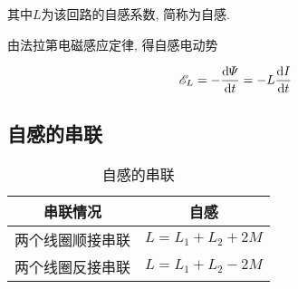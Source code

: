 其中$L$为该回路的自感系数, 简称为自感. 

由法拉第电磁感应定律, 得自感电动势

\begin{equation}
	\mathscr{E}_L = -\dv{\varPsi}{t} = -L \dv{I}{t} \label{C9-eq17}
\end{equation}

\subsection{自感的串联}

\begin{table}[H]
	\centering
	\caption{自感的串联}
	\begin{tabular}{cc}
		\toprule[1pt]
		串联情况 & 自感 \\
		\hline
		两个线圈顺接串联 & $L = L_1 + L_2 + 2M$ \\
		两个线圈反接串联 & $L = L_1 + L_2 - 2M$ \\
		\bottomrule[1pt]
	\end{tabular}
\end{table}

